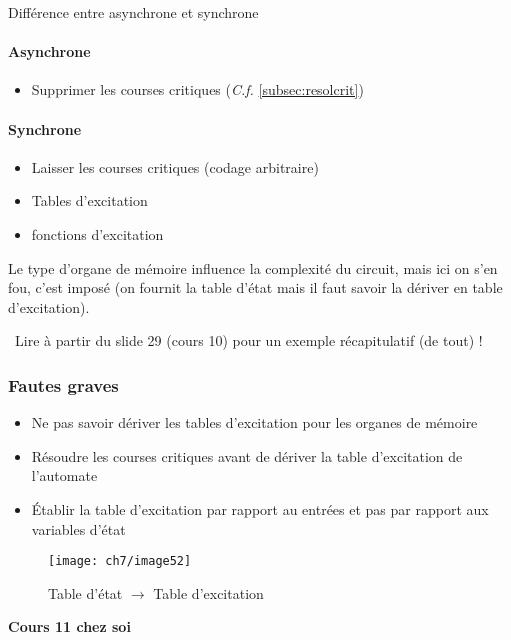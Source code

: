 \centerline{Différence entre asynchrone et synchrone}
\begin{multicols}{2}
	\paragraph{Asynchrone}
	\begin{itemize}
		\item Supprimer les courses critiques (\textit{C.f.} \autoref{subsec:resolcrit})
	\end{itemize}
	\columnbreak
	\paragraph{Synchrone}
	\begin{itemize}
		\item Laisser les courses critiques (codage arbitraire)
		\item Tables d'excitation
		\item fonctions d'excitation
	\end{itemize}
\end{multicols}
Le type d'organe de mémoire influence la complexité du circuit, mais ici on s'en fou, c'est imposé (on fournit la table d'état mais il faut savoir la dériver en table d'excitation).\\

\centerline{{\huge\danger}\ Lire à partir du slide 29 (cours 10) pour un exemple récapitulatif (de tout) ! {\huge\danger}}
\subsubsection{Fautes graves}
\begin{itemize}
	\item Ne pas savoir dériver les tables d'excitation pour les organes de mémoire
	\item Résoudre les courses critiques avant de dériver la table d'excitation de l'automate
	\item Établir la table d'excitation par rapport au entrées et pas par rapport aux variables d'état
\end{itemize}
\begin{figure}[H] 
	\centering 
	\texttt{[image: ch7/image52]} 
	\caption{Table d'état $\rightarrow$ Table d'excitation}
\end{figure}
\begin{center}
	\textbf{\large Cours 11 chez soi}
\end{center}